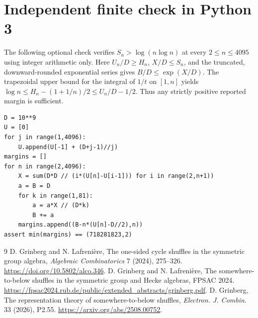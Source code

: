 \documentclass[11pt]{article}
\begin{document}
\section{Independent finite check in Python 3}
The following optional check verifies $S_n>\log(n\log n)$ at every $2\le n\le4095$ using integer arithmetic only. Here $U_n/D\ge H_n$, $X/D\le S_n$, and the truncated, downward-rounded exponential series gives $B/D\le\exp(X/D)$. The trapezoidal upper bound for the integral of $1/t$ on $[1,n]$ yields $\log n\le H_n-(1+1/n)/2\le U_n/D-1/2$. Thus any strictly positive reported margin is sufficient.
\begin{verbatim}
D = 10**9
U = [0]
for j in range(1,4096):
    U.append(U[-1] + (D+j-1)//j)
margins = []
for n in range(2,4096):
    X = sum(D*D // (i*(U[n]-U[i-1])) for i in range(2,n+1))
    a = B = D
    for k in range(1,81):
        a = a*X // (D*k)
        B += a
    margins.append((B-n*(U[n]-D//2),n))
assert min(margins) == (718281823,2)
\end{verbatim}
\begin{thebibliography}{9}
 D. Grinberg and N. Lafrenière, The one-sided cycle shuffles in the symmetric group algebra, \emph{Algebraic Combinatorics} 7 (2024), 275--326. \url{https://doi.org/10.5802/alco.346}.
 D. Grinberg and N. Lafrenière, The somewhere-to-below shuffles in the symmetric group and Hecke algebras, FPSAC 2024. \url{https://fpsac2024.rub.de/public/extended_abstracts/grinberg.pdf}.
 D. Grinberg, The representation theory of somewhere-to-below shuffles, \emph{Electron. J. Combin.} 33 (2026), P2.55. \url{https://arxiv.org/abs/2508.00752}.
\end{thebibliography}
\end{document}
